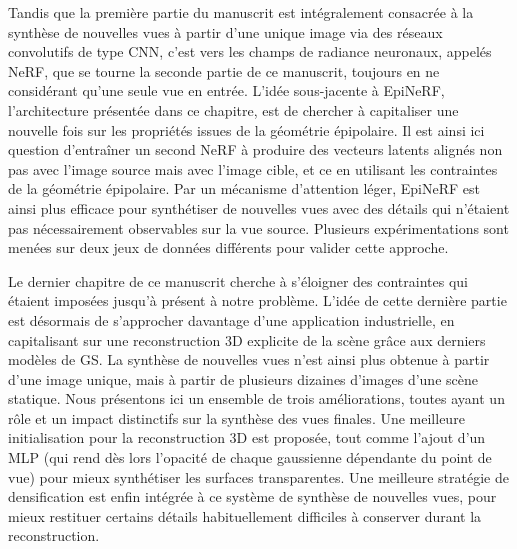 Tandis que la première partie du manuscrit est intégralement consacrée à la synthèse de nouvelles vues à partir d'une unique image via des réseaux convolutifs de type \ac{CNN}, c'est vers les champs de radiance neuronaux, appelés \ac{NeRF}, que se tourne la seconde partie de ce manuscrit, toujours en ne considérant qu'une seule vue en entrée. L'idée sous-jacente à EpiNeRF, l'architecture présentée dans ce chapitre, est de chercher à capitaliser une nouvelle fois sur les propriétés issues de la géométrie épipolaire. Il est ainsi ici question d'entraîner un second \ac{NeRF} à produire des vecteurs latents alignés non pas avec l'image source mais avec l'image cible, et ce en utilisant les contraintes de la géométrie épipolaire. Par un mécanisme d'attention léger, EpiNeRF est ainsi plus efficace pour synthétiser de nouvelles vues avec des détails qui n'étaient pas nécessairement observables sur la vue source. Plusieurs expérimentations sont menées sur deux jeux de données différents pour valider cette approche.

Le dernier chapitre de ce manuscrit cherche à s'éloigner des contraintes qui étaient imposées jusqu'à présent à notre problème. L'idée de cette dernière partie est désormais de s'approcher davantage d'une application industrielle, en capitalisant sur une reconstruction 3D explicite de la scène grâce aux derniers modèles de \ac{GS}. La synthèse de nouvelles vues n'est ainsi plus obtenue à partir d'une image unique, mais à partir de plusieurs dizaines d'images d'une scène statique. Nous présentons ici un ensemble de trois améliorations, toutes ayant un rôle et un impact distinctifs sur la synthèse des vues finales. Une meilleure initialisation pour la reconstruction 3D est proposée, tout comme l'ajout d'un \ac{MLP} (qui rend dès lors l'opacité de chaque gaussienne dépendante du point de vue) pour mieux synthétiser les surfaces transparentes. Une meilleure stratégie de densification est enfin intégrée à ce système de synthèse de nouvelles vues, pour mieux restituer certains détails habituellement difficiles à conserver durant la reconstruction.


